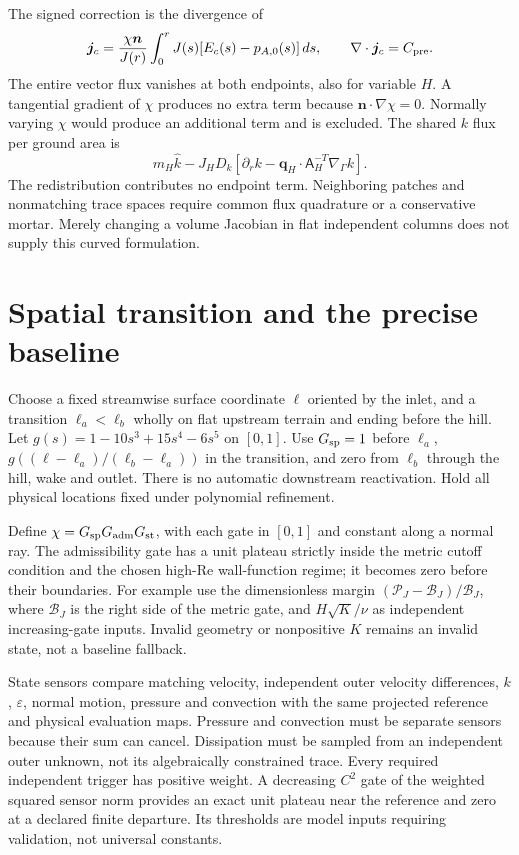 \documentclass[11pt,a4paper]{article}
\numberwithin{equation}{section}
\begin{document}
The signed correction is the divergence of
\begin{equation}
 \bm j_c=\frac{\chi\bm n}{J(r)}
 \int_0^rJ(s)[E_c(s)-p_{A,0}(s)]\,ds,
 \qquad \nabla\cdot\bm j_c=C_{\rm pre}.
 \label{eq:wj-wall-metric-redistribution}
\end{equation}
The entire vector flux vanishes at both endpoints, also for variable
$H$. A tangential gradient of $\chi$ produces no extra term because
$\bm n\cdot\nabla\chi=0$. Normally varying $\chi$ would produce an
additional term and is excluded. The shared $k$ flux per ground area is
\begin{equation}
 m_H\widehat k-J_HD_k\left[
 \partial_rk-\bm q_H\cdot\mathsf A_H^{-T}\nabla_\Gamma k\right].
 \label{eq:wj-wall-k-interface}
\end{equation}
The redistribution contributes no endpoint term. Neighboring patches and
nonmatching trace spaces require common flux quadrature or a conservative
mortar. Merely changing a volume Jacobian in flat independent columns
does not supply this curved formulation.


\section{Spatial transition and the precise baseline}
\label{sec:wj-wall-switch}

Choose a fixed streamwise surface coordinate $\ell$ oriented by the inlet,
and a transition $\ell_a<\ell_b$ wholly on flat upstream terrain and
ending before the hill. Let $g(s)=1-10s^3+15s^4-6s^5$ on $[0,1]$.
Use $G_{\rm sp}=1$ before $\ell_a$, $g((\ell-\ell_a)/(\ell_b-\ell_a))$
in the transition, and zero from $\ell_b$ through the hill, wake and
outlet. There is no automatic downstream reactivation. Hold all physical
locations fixed under polynomial refinement.

Define $\chi=G_{\rm sp}G_{\rm adm}G_{\rm st}$, with each gate in
$[0,1]$ and constant along a normal ray. The admissibility gate has a
unit plateau strictly inside the metric cutoff condition and the chosen
high-Re wall-function regime; it becomes zero before their boundaries.
For example use the dimensionless margin
$(\mathcal P_J-\mathcal B_J)/\mathcal B_J$, where $\mathcal B_J$ is
the right side of the metric gate, and $H\sqrt K/\nu$ as independent
increasing-gate inputs. Invalid geometry or nonpositive $K$ remains an
invalid state, not a baseline fallback.

State sensors compare matching velocity, independent outer velocity
differences, $k$, $\varepsilon$, normal motion, pressure and convection
with the same projected reference and physical evaluation maps.
Pressure and convection must be separate sensors because their sum can
cancel. Dissipation must be sampled from an independent outer unknown,
not its algebraically constrained trace. Every required independent
trigger has positive weight. A decreasing $C^2$ gate of the weighted
squared sensor norm provides an exact unit plateau near the reference
and zero at a declared finite departure. Its thresholds are model inputs
requiring validation, not universal constants.
\end{document}
